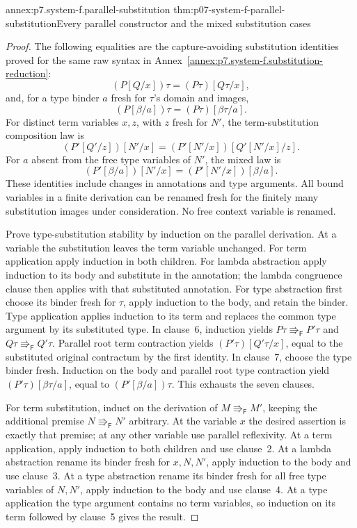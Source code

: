 \begin{annexitem}{annex:p7.system-f.parallel-substitution}
 {thm:p07-system-f-parallel-substitution}{Every parallel constructor and the mixed substitution cases}
\begin{proof}
The following equalities are the capture-avoiding substitution identities
proved for the same raw syntax in
Annex~\ref{annex:p7.system-f.substitution-reduction}:
\[
 (P[Q/x])\tau=(P\tau)[Q\tau/x],
\]
and, for a type binder \(a\) fresh for \(\tau\)'s domain and images,
\[
 (P[\beta/a])\tau=(P\tau)[\beta\tau/a].
\]
For distinct term variables \(x,z\), with \(z\) fresh for \(N'\),
the term-substitution composition law is
\[
 (P'[Q'/z])[N'/x]
    =(P'[N'/x])[Q'[N'/x]/z].
\]
For \(a\) absent from the free type variables of \(N'\), the mixed
law is
\[
 (P'[\beta/a])[N'/x]=(P'[N'/x])[\beta/a].
\]
These identities include changes in annotations and type arguments. All
bound variables in a finite derivation can be renamed fresh for the
finitely many substitution images under consideration. No free context
variable is renamed.

Prove type-substitution stability by induction on the parallel derivation.
At a variable the substitution leaves the term variable unchanged.
For term application apply induction in both children. For lambda
abstraction apply induction to its body and substitute in the annotation;
the lambda congruence clause then applies with that substituted annotation.
For type abstraction first choose its binder fresh for \(\tau\), apply
induction to the body, and retain the binder. Type application applies
induction to its term and replaces the common type argument by its
substituted type. In clause~6, induction yields \(P\tau\Rrightarrow
_{\mathsf F}P'\tau\) and \(Q\tau\Rrightarrow_{\mathsf F}Q'\tau\).
Parallel root term contraction yields \((P'\tau)[Q'\tau/x]\), equal
to the substituted original contractum by the first identity. In clause~7,
choose the type binder fresh. Induction on the body and parallel root
type contraction yield \((P'\tau)[\beta\tau/a]\), equal to
\((P'[\beta/a])\tau\). This exhausts the seven clauses.

For term substitution, induct on the derivation of
\(M\Rrightarrow_{\mathsf F}M'\), keeping the additional premise
\(N\Rrightarrow_{\mathsf F}N'\) arbitrary. At the variable \(x\)
the desired assertion is exactly that premise; at any other variable use
parallel reflexivity. At a term application, apply induction to both
children and use clause~2. At a lambda abstraction rename its binder
fresh for \(x,N,N'\), apply induction to the body and use clause~3.
At a type abstraction rename its binder fresh for all free type variables
of \(N,N'\), apply induction to the body and use clause~4. At a type
application the type argument contains no term variables, so induction
on its term followed by clause~5 gives the result.


\end{proof}
\end{annexitem}
